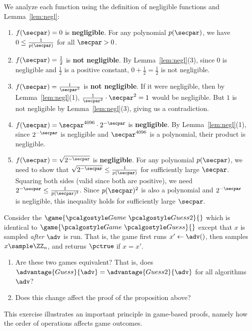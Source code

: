 \ifsolutions
\begin{mysolution}
  We analyze each function using the definition of negligible functions and Lemma~\ref{lem:negl}:
  \begin{enumerate}
    \item $f(\secpar) = 0$ is \textbf{negligible}.
    For any polynomial $p(\secpar)$, we have $0 \le \frac{1}{p(\secpar)}$ for all $\secpar > 0$.
    
    \item $f(\secpar) = \frac{1}{2}$ is \textbf{not negligible}.
    By Lemma~\ref{lem:negl}(3), since $0$ is negligible and $\frac{1}{2}$ is a positive constant, $0 + \frac{1}{2} = \frac{1}{2}$ is not negligible.
    
    \item $f(\secpar) = \frac{1}{\secpar^2}$ is \textbf{not negligible}.
    If it were negligible, then by Lemma~\ref{lem:negl}(1), $\frac{1}{\secpar^2} \cdot \secpar^2 = 1$ would be negligible.
    But $1$ is not negligible by Lemma~\ref{lem:negl}(3), giving us a contradiction.
    
    \item $f(\secpar) = \secpar^{4096} \cdot 2^{-\secpar}$ is \textbf{negligible}.
    By Lemma~\ref{lem:negl}(1), since $2^{-\secpar}$ is negligible and $\secpar^{4096}$ is a polynomial, their product is negligible.
    
    \item $f(\secpar) = \sqrt{2^{-\secpar}}$ is \textbf{negligible}.
    For any polynomial $p(\secpar)$, we need to show that $\sqrt{2^{-\secpar}} \le \frac{1}{p(\secpar)}$ for sufficiently large $\secpar$.
    Squaring both sides (valid since both are positive), we need $2^{-\secpar} \le \frac{1}{p(\secpar)^2}$.
    Since $p(\secpar)^2$ is also a polynomial and $2^{-\secpar}$ is negligible, this inequality holds for sufficiently large $\secpar$.
  \end{enumerate}
\end{mysolution}
\fi

\begin{exercise}\label{ex:guessing-game-equivalence}
  Consider the $\game{\Game~\algo{Guess2}}{}$ which is identical to $\game{\Game~\algo{Guess}}{}$ except that $x$ is sampled \emph{after} $\adv$ is run.
  That is, the game first runs $x' \gets \adv()$, then samples $x \sample \ZZ_n$, and returns $\pctrue$ if $x = x'$.
  \begin{enumerate}
    \item Are these two games equivalent? That is, does $\advantage{Guess}{\adv} = \advantage{Guess2}{\adv}$ for all algorithms $\adv$?
    \item Does this change affect the proof of the proposition above?
  \end{enumerate}
  
  This exercise illustrates an important principle in game-based proofs, namely how the order of operations affects game outcomes.
\end{exercise}

